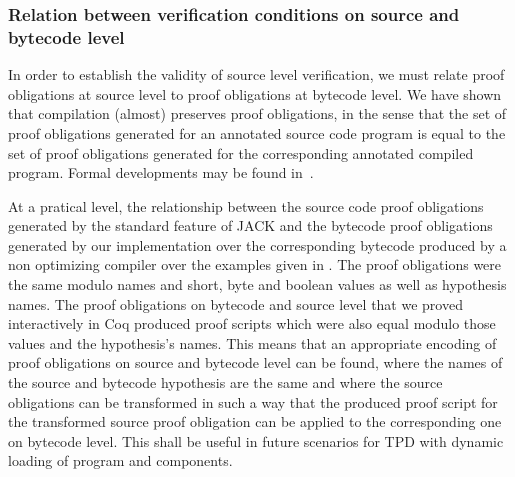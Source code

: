 
 \subsubsection{Relation between verification conditions on source and
 bytecode level } \label{pogEquiv} 

In order to establish the validity of source level verification, we
must relate proof obligations at source level to proof obligations at
bytecode level. We have shown that compilation (almost) preserves
proof obligations, in the sense that the set of proof obligations
generated for an annotated source code program is equal to the set of
proof obligations generated for the corresponding annotated compiled
program. Formal developments may be found
in~\cite{gta05:fast,BP06:sac}.


At a pratical level, the relationship between the source code proof
obligations generated by the standard feature of JACK and the bytecode
proof obligations generated by our implementation over the
corresponding bytecode produced by a non optimizing compiler over the
examples given in \cite{JPVC03JKM}. The proof obligations were the
same modulo names and short, byte and boolean values as well as
hypothesis names. The proof obligations on bytecode and source level
that we proved interactively in Coq produced proof scripts which were
also equal modulo those values and the hypothesis's names. This means
that an appropriate encoding of proof obligations on source and
bytecode level can be found, where the names of the source and
bytecode hypothesis are the same and where the source obligations can
be transformed in such a way that the produced proof script for the
transformed source proof obligation can be applied to the
corresponding one on bytecode level. This shall be useful in future
scenarios for TPD with dynamic loading of program and components.



 

